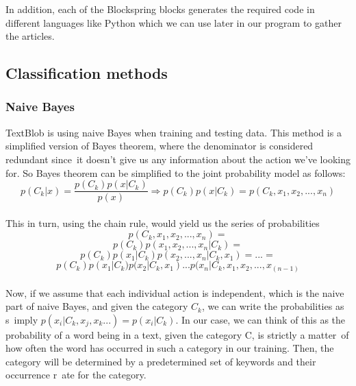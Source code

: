 \documentclass[a4paper]{article}
\begin{document}
In addition, each of the Blockspring blocks generates the required code in different languages like Python which we can use later in our program to gather the articles. 


\subsection{Classification methods}
\subsubsection{Naive Bayes}
TextBlob is using naive Bayes when training and testing data. This method is a simplified version of Bayes theorem, where the denominator is considered redundant since\
 it doesn't give us any information about the action we've looking for. So Bayes theorem can be simplified to the joint probability model as follows:
\\\[p(C_k|x) = \frac{p(C_k)p(x|C_k)}{p(x)} \Longrightarrow p(C_k)p(x|C_k) = p(C_k,x_1,x_2,...,x_n)\]\\
This in turn, using the chain rule, would yield us the series of probabilities \[p(C_k,x_1,x_2,...,x_n) = \]
\[p(C_k)p(x_1,x_2,...,x_n|C_k) =\]
\[p(C_k)p(x_1|C_k)p(x_2,...,x_n|C_k, x_1) = ... =\]
\[p(C_k)p(x_1|C_k)p(x_2|C_k, x_1) ... p(x_n|C_k, x_1, x_2,...,x_(n-1) \]\\
Now, if we assume that each individual action is independent, which is the naive part of naive Bayes, and given the category $C_k$, we can write the probabilities as s\
imply $p(x_i|C_k, x_j,x_k...) = p(x_i|C_k)$. In our case, we can think of this as the probability of a word being in a text, given the category C, is strictly a matter\
 of how often the word has occurred in such a category in our training. Then, the category will be determined by a predetermined set of keywords and their occurrence r\
ate for the category.
\end{document}
